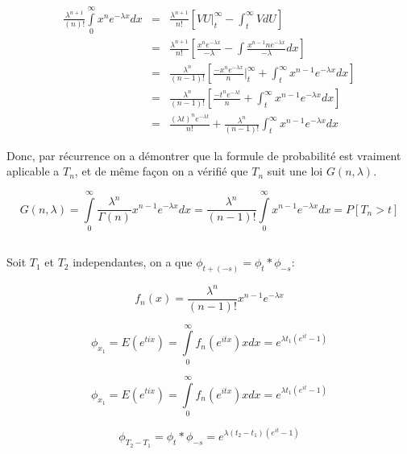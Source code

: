 \documentclass[a4paper]{article}
\begin{document}
\begin{eqnarray*}
\frac{\lambda^{n+1}}{(n)!}\int\limits_0^\infty x^{n}e^{-\lambda
  x}dx &=& \frac{\lambda^{n+1}}{n!}[VU|_t^\infty - \int_t^\infty VdU] \\
& =&\frac{\lambda^{n+1}}{n!}[\frac{x^n    e^{-\lambda     x}}{-\lambda}    -    \int
\frac{x^{n-1}n e^{-\lambda x}}{-\lambda}dx] \\
& =&  \frac{\lambda^{n}}{(n-1)!}[\frac{-x^n e^{-\lambda x}}{n}|_t^\infty +
\int_t^\infty{x^{n-1} e^{-\lambda x}}dx] \\
& =&  \frac{\lambda^{n}}{(n-1)!}[\frac{-t^n e^{-\lambda t}}{n} +
\int_t^\infty{x^{n-1} e^{-\lambda x}}dx] \\
& =& \frac{(\lambda t)^n e^{-\lambda t}}{n!} +
\frac{\lambda^{n}}{(n-1)!}\int_t^\infty{x^{n-1} e^{-\lambda x}}dx
\end{eqnarray*}

Donc, par récurrence  on a démontrer que la formule  de probabilité est vraiment
aplicable a $T_n$, et de même façon on a vérifié que $T_n$ suit une loi $G(n,\lambda)$.

\begin{equation}
G(n,\lambda)= \int\limits_0^\infty \frac{\lambda^{n}}{\Gamma (n)}x^{n-1}e^{-\lambda x}dx=\frac{\lambda^{n}}{(n-1)!}\int\limits_0^\infty x^{n-1}e^{-\lambda x}dx=P[T_n > t]
\end{equation}


\subsection{}
Soit $T_1$ et $T_2$ independantes, on a que $\phi_{t+(-s)}=\phi_t*\phi_{-s}$:

\begin{equation}
f_n(x)=\frac{\lambda^{n}}{(n-1)!}x^{n-1}e^{-\lambda x}
\end{equation}

\begin{equation}
\phi_{x_1}=E(e^{tix})=\int\limits_0^\infty f_n(e^{itx})xdx=e^{\lambda t_1(e^{it}-1)}
\end{equation}

\begin{equation}
\phi_{x_1}=E(e^{tix})=\int\limits_0^\infty f_n(e^{itx})xdx=e^{\lambda t_1(e^{it}-1)}
\end{equation}

\begin{equation}
\phi_{T_2-T_1}=\phi_t*\phi_{-s}=e^{\lambda (t_2-t_1)(e^{it}-1)}
\end{equation}
\end{document}
